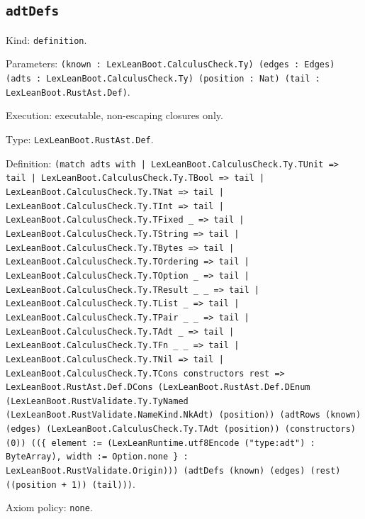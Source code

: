\documentclass[11pt]{article}
\begin{document}
\subsection*{\texttt{adtDefs}}
\noindent Kind: \texttt{definition}.\par
\noindent Parameters: \texttt{(known : LexLeanBoot.CalculusCheck.Ty) (edges : Edges) (adts : LexLeanBoot.CalculusCheck.Ty) (position : Nat) (tail : LexLeanBoot.RustAst.Def)}.\par
\noindent Execution: executable, non-escaping closures only.\par
\noindent Type: \texttt{LexLeanBoot.RustAst.Def}.\par
\noindent Definition: \texttt{(match adts with | LexLeanBoot.CalculusCheck.Ty.TUnit => tail | LexLeanBoot.CalculusCheck.Ty.TBool => tail | LexLeanBoot.CalculusCheck.Ty.TNat => tail | LexLeanBoot.CalculusCheck.Ty.TInt => tail | LexLeanBoot.CalculusCheck.Ty.TFixed \_ => tail | LexLeanBoot.CalculusCheck.Ty.TString => tail | LexLeanBoot.CalculusCheck.Ty.TBytes => tail | LexLeanBoot.CalculusCheck.Ty.TOrdering => tail | LexLeanBoot.CalculusCheck.Ty.TOption \_ => tail | LexLeanBoot.CalculusCheck.Ty.TResult \_ \_ => tail | LexLeanBoot.CalculusCheck.Ty.TList \_ => tail | LexLeanBoot.CalculusCheck.Ty.TPair \_ \_ => tail | LexLeanBoot.CalculusCheck.Ty.TAdt \_ => tail | LexLeanBoot.CalculusCheck.Ty.TFn \_ \_ => tail | LexLeanBoot.CalculusCheck.Ty.TNil => tail | LexLeanBoot.CalculusCheck.Ty.TCons constructors rest => LexLeanBoot.RustAst.Def.DCons (LexLeanBoot.RustAst.Def.DEnum (LexLeanBoot.RustValidate.Ty.TyNamed (LexLeanBoot.RustValidate.NameKind.NkAdt) (position)) (adtRows (known) (edges) (LexLeanBoot.CalculusCheck.Ty.TAdt (position)) (constructors) (0)) ((\{ element := (LexLeanRuntime.utf8Encode ("type:adt") : ByteArray), width := Option.none \} : LexLeanBoot.RustValidate.Origin))) (adtDefs (known) (edges) (rest) ((position + 1)) (tail)))}.\par
\noindent Axiom policy: \texttt{none}.\par
\end{document}
